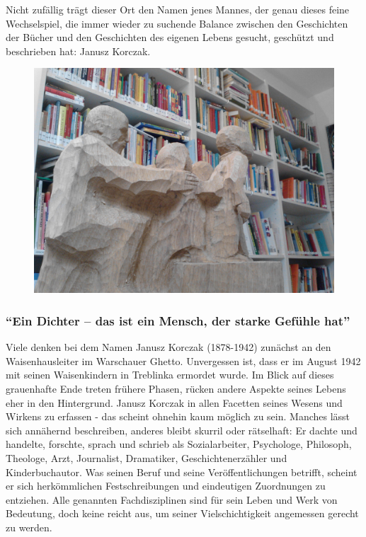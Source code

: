 \documentclass[a4paper,
fontsize=11pt,
oneside,
numbers=noperiodatend,
parskip=half-,
bibliography=totoc,
final
]{scrartcl}
\begin{document}
Nicht zufällig trägt dieser Ort den Namen jenes Mannes, der genau dieses
feine Wechselspiel, die immer wieder zu suchende Balance zwischen den
Geschichten der Bücher und den Geschichten des eigenen Lebens gesucht,
geschützt und beschrieben hat: Janusz Korczak.

\begin{figure}
\centering
\includegraphics{img/abbildung2.jpg}
\end{figure}

\subsubsection{\texorpdfstring{\enquote{Ein Dichter -- das ist ein
Mensch, der starke Gefühle
hat}}{Ein Dichter -- das ist ein Mensch, der starke Gefühle hat}}\label{ein-dichter-das-ist-ein-mensch-der-starke-gefuxfchle-hat}

Viele denken bei dem Namen Janusz Korczak (1878-1942) zunächst an den
Waisenhausleiter im Warschauer Ghetto. Unvergessen ist, dass er im
August 1942 mit seinen Waisenkindern in Treblinka ermordet wurde. Im
Blick auf dieses grauenhafte Ende treten frühere Phasen, rücken andere
Aspekte seines Lebens eher in den Hintergrund. Janusz Korczak in allen
Facetten seines Wesens und Wirkens zu erfassen - das scheint ohnehin
kaum möglich zu sein. Manches lässt sich annähernd beschreiben, anderes
bleibt skurril oder rätselhaft: Er dachte und handelte, forschte, sprach
und schrieb als Sozialarbeiter, Psychologe, Philosoph, Theologe, Arzt,
Journalist, Dramatiker, Geschichtenerzähler und Kinderbuchautor. Was
seinen Beruf und seine Veröffentlichungen betrifft, scheint er sich
herkömmlichen Festschreibungen und eindeutigen Zuordnungen zu entziehen.
Alle genannten Fachdisziplinen sind für sein Leben und Werk von
Bedeutung, doch keine reicht aus, um seiner Vielschichtigkeit angemessen
gerecht zu werden.
\end{document}
